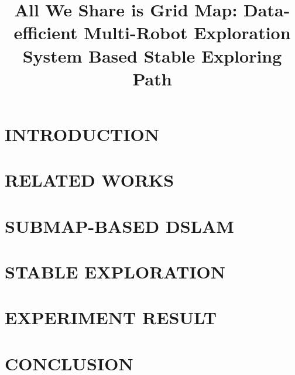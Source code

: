 \documentclass[letterpaper, 10 pt, conference]{ieeeconf}  %
\title{\LARGE \bf
All We Share is Grid Map: Data-efficient Multi-Robot Exploration System Based Stable Exploring Path
}
\begin{document}
\maketitle
\thispagestyle{empty}
\pagestyle{empty}


\begin{abstract}

\end{abstract}


\section{INTRODUCTION}


\section{RELATED WORKS}


\section{SUBMAP-BASED DSLAM}


\section{STABLE EXPLORATION}


\section{EXPERIMENT RESULT}


\section{CONCLUSION}




\end{document}
